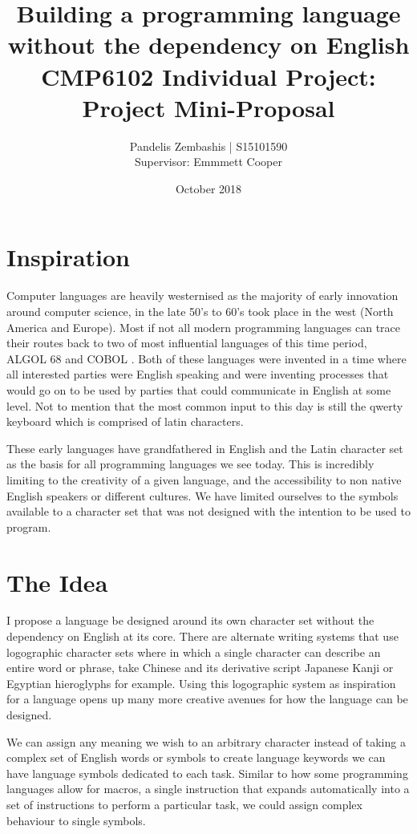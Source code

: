 \documentclass[12pt]{article}
\title{%
  Building a programming language without the dependency on English \\
  \large CMP6102 Individual Project:
 Project Mini-Proposal }
\author{Pandelis Zembashis | S15101590 \\ 
Supervisor: Emmmett Cooper}
\date{October 2018}
\begin{document}
\maketitle

\section{Inspiration}

Computer languages are heavily westernised as the majority of 
early innovation around computer science, in the late 50's to 60's 
took place in the west (North America and Europe). Most if not all
modern programming languages can trace their routes back to two of
most influential languages of this time period, ALGOL 68 and COBOL 
\parencite{5396281}. Both of these languages were invented in a time
where all interested parties were English speaking and were inventing
processes that would go on to be used by parties that could communicate
in English at some level. Not to mention that the most common input to this
day is still the qwerty keyboard which is comprised of latin characters.

These early languages have grandfathered in English and the Latin 
character set as the basis for all programming languages we see today. 
This is incredibly limiting to the creativity of a given language,
and the accessibility to non native English speakers or different cultures. 
We have limited ourselves to the symbols available to a character set that was not designed with the intention
to be used to program.

\section{The Idea}

I propose a language be designed around its own character set without the dependency on English at its core.
There are alternate writing systems that use logographic character sets where in which a single
character can describe an entire word or phrase, take Chinese and its derivative script Japanese Kanji or Egyptian hieroglyphs for example.
Using this logographic system as inspiration for a language opens up many more creative
avenues for how the language can be designed. 

We can assign any meaning we wish to an arbitrary character
instead of taking a complex set of English words or symbols to create language keywords we can have language symbols dedicated to each task.
Similar to how some programming languages allow for macros, a single instruction that expands automatically into a set of instructions to perform a particular task,
we could assign complex behaviour to single symbols.
\end{document}
